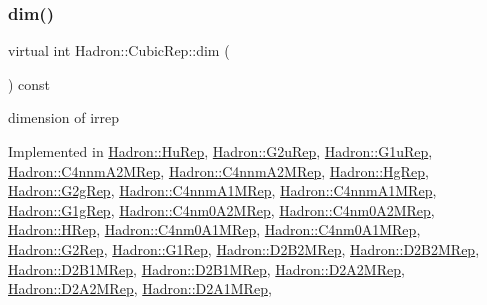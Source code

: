 \subsubsection{\texorpdfstring{dim()}{dim()}\hspace{0.1cm}{\footnotesize\ttfamily [1/2]}}
{\footnotesize\ttfamily virtual int Hadron\+::\+Cubic\+Rep\+::dim (\begin{DoxyParamCaption}{ }\end{DoxyParamCaption}) const\hspace{0.3cm}{\ttfamily [pure virtual]}}

dimension of irrep 

Implemented in \mbox{\hyperlink{structHadron_1_1HuRep_aa222968e65bfc228eb9acf15a7df0388}{Hadron\+::\+Hu\+Rep}}, \mbox{\hyperlink{structHadron_1_1G2uRep_a1cfbf4340498e3300f5d921ed683dea8}{Hadron\+::\+G2u\+Rep}}, \mbox{\hyperlink{structHadron_1_1G1uRep_a13d30ff40203d77d9beacee3e48dbbd7}{Hadron\+::\+G1u\+Rep}}, \mbox{\hyperlink{structHadron_1_1C4nnmA2MRep_a5c3be88143a9c05ede78e8d988d21c52}{Hadron\+::\+C4nnm\+A2\+M\+Rep}}, \mbox{\hyperlink{structHadron_1_1C4nnmA2MRep_a5c3be88143a9c05ede78e8d988d21c52}{Hadron\+::\+C4nnm\+A2\+M\+Rep}}, \mbox{\hyperlink{structHadron_1_1HgRep_ad951f39b175b012e73b0f66217b25032}{Hadron\+::\+Hg\+Rep}}, \mbox{\hyperlink{structHadron_1_1G2gRep_a8aa2fce05b77da3aab118ec1e5f16687}{Hadron\+::\+G2g\+Rep}}, \mbox{\hyperlink{structHadron_1_1C4nnmA1MRep_afb797b4baebc8d261c96fd1f173825b6}{Hadron\+::\+C4nnm\+A1\+M\+Rep}}, \mbox{\hyperlink{structHadron_1_1C4nnmA1MRep_afb797b4baebc8d261c96fd1f173825b6}{Hadron\+::\+C4nnm\+A1\+M\+Rep}}, \mbox{\hyperlink{structHadron_1_1G1gRep_aa6f93ed967ef889de7a9f5aaad48a69b}{Hadron\+::\+G1g\+Rep}}, \mbox{\hyperlink{structHadron_1_1C4nm0A2MRep_a74531346885cc1d3a3b3e7749bfbc5f7}{Hadron\+::\+C4nm0\+A2\+M\+Rep}}, \mbox{\hyperlink{structHadron_1_1C4nm0A2MRep_a74531346885cc1d3a3b3e7749bfbc5f7}{Hadron\+::\+C4nm0\+A2\+M\+Rep}}, \mbox{\hyperlink{structHadron_1_1HRep_a7ed087e9f4edb84e1c537c6c39680b85}{Hadron\+::\+H\+Rep}}, \mbox{\hyperlink{structHadron_1_1C4nm0A1MRep_ae62b548a67faabb6850b1fc035815dc4}{Hadron\+::\+C4nm0\+A1\+M\+Rep}}, \mbox{\hyperlink{structHadron_1_1C4nm0A1MRep_ae62b548a67faabb6850b1fc035815dc4}{Hadron\+::\+C4nm0\+A1\+M\+Rep}}, \mbox{\hyperlink{structHadron_1_1G2Rep_a7c8d894ff5da6fead1964484c04a4c80}{Hadron\+::\+G2\+Rep}}, \mbox{\hyperlink{structHadron_1_1G1Rep_ab5e3b558f74546bd0c29b5a913aca993}{Hadron\+::\+G1\+Rep}}, \mbox{\hyperlink{structHadron_1_1D2B2MRep_a5beebf66fecabd7ee94b861df9f607c9}{Hadron\+::\+D2\+B2\+M\+Rep}}, \mbox{\hyperlink{structHadron_1_1D2B2MRep_a5beebf66fecabd7ee94b861df9f607c9}{Hadron\+::\+D2\+B2\+M\+Rep}}, \mbox{\hyperlink{structHadron_1_1D2B1MRep_a8d1c9f35b426e8848c73fa423f4f2a4b}{Hadron\+::\+D2\+B1\+M\+Rep}}, \mbox{\hyperlink{structHadron_1_1D2B1MRep_a8d1c9f35b426e8848c73fa423f4f2a4b}{Hadron\+::\+D2\+B1\+M\+Rep}}, \mbox{\hyperlink{structHadron_1_1D2A2MRep_a8c1eee2c61a4d9f6721fe703253d5c26}{Hadron\+::\+D2\+A2\+M\+Rep}}, \mbox{\hyperlink{structHadron_1_1D2A2MRep_a8c1eee2c61a4d9f6721fe703253d5c26}{Hadron\+::\+D2\+A2\+M\+Rep}}, \mbox{\hyperlink{structHadron_1_1D2A1MRep_a2a6e259c17f5c9b6c35271b8b25ecfab}{Hadron\+::\+D2\+A1\+M\+Rep}}, 